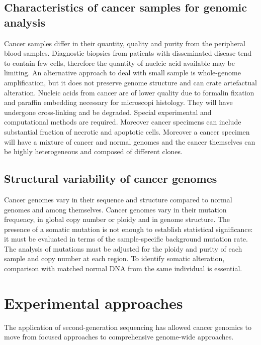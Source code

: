 	\subsection{Characteristics of cancer samples for genomic analysis}
	Cancer samples differ in their quantity, quality and purity from the peripheral blood samples.
	Diagnostic biopsies from patients with disseminated disease tend to contain few cells, therefore the quantity of nucleic acid available may be limiting.
	An alternative approach to deal with small sample is whole-genome amplification, but it does not preserve genome structure and can crate artefactual alteration.
	Nucleic acids from cancer are of lower quality due to formalin fixation and paraffin embedding necessary for microscopi histology.
	They will have undergone cross-linking and be degraded.
	Special experimental and computational methods are required.
	Moreover cancer specimens can include substantial fraction of necrotic and apoptotic cells.
	Moreover a cancer specimen will have a mixture of cancer and normal genomes and the cancer themselves can be highly heterogeneous and composed of different clones.

	\subsection{Structural variability of cancer genomes}
	Cancer genomes vary in their sequence and structure compared to normal genomes and among themselves.
	Cancer genomes vary in their mutation frequency, in global copy number or ploidy and in genome structure.
	The presence of a somatic mutation is not enough to establish statistical significance: it must be evaluated in terms of the sample-specific background mutation rate.
	The analysis of mutations must be adjusted for the ploidy and purity of each sample and copy number at each region.
	To identify somatic alteration, comparison with matched normal DNA from the same individual is essential.

\section{Experimental approaches}
The application of second-generation sequencing has allowed cancer genomics to move from focused approaches to comprehensive genome-wide approaches.

